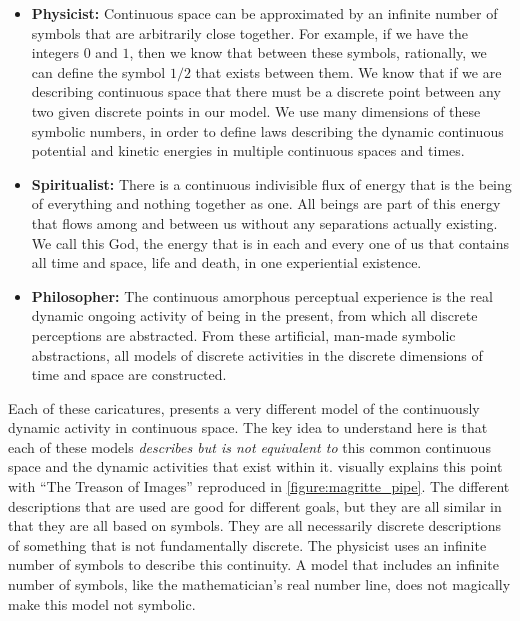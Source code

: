 \begin{itemize}
\item {\bf{Physicist:}} Continuous space can be approximated by an
  infinite number of symbols that are arbitrarily close together.  For
  example, if we have the integers $0$ and $1$, then we know that
  between these symbols, rationally, we can define the symbol $1/2$
  that exists between them.  We know that if we are describing
  continuous space that there must be a discrete point between any two
  given discrete points in our model.  We use many dimensions of these
  symbolic numbers, in order to define laws describing the dynamic
  continuous potential and kinetic energies in multiple continuous
  spaces and times.
\item {\bf{Spiritualist:}} There is a continuous indivisible flux of
  energy that is the being of everything and nothing together as one.
  All beings are part of this energy that flows among and between us
  without any separations actually existing.  We call this God, the
  energy that is in each and every one of us that contains all time
  and space, life and death, in one experiential existence.
\item {\bf{Philosopher:}} The continuous amorphous perceptual
  experience is the real dynamic ongoing activity of being in the
  present, from which all discrete perceptions are abstracted.  From
  these artificial, man-made symbolic abstractions, all models of
  discrete activities in the discrete dimensions of time and space are
  constructed.
\end{itemize}
Each of these caricatures, presents a very different model of the
continuously dynamic activity in continuous space.  The key idea to
understand here is that each of these models \emph{describes but is
  not equivalent to} this common continuous space and the dynamic
activities that exist within it.  \cite{magritte:1919} visually
explains this point with ``The Treason of Images'' reproduced in
\autoref{figure:magritte_pipe}.  The different descriptions that are
used are good for different goals, but they are all similar in that
they are all based on symbols.  They are all necessarily discrete
descriptions of something that is not fundamentally discrete.  The
physicist uses an infinite number of symbols to describe this
continuity.  A model that includes an infinite number of symbols, like
the mathematician's real number line, does not magically make this
model not symbolic.
